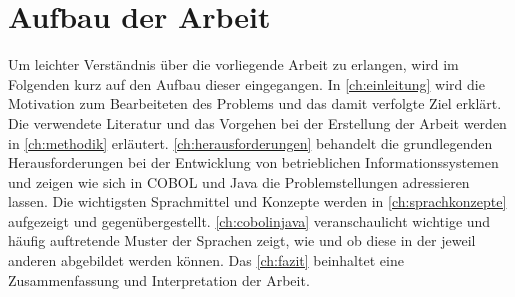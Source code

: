 \section{Aufbau der Arbeit}
Um leichter Verständnis über die vorliegende Arbeit zu erlangen, wird im Folgenden kurz auf den Aufbau dieser eingegangen.
In \autoref{ch:einleitung} wird die Motivation zum Bearbeiteten des Problems und das damit verfolgte Ziel erklärt. 
Die verwendete Literatur und das Vorgehen bei der Erstellung der Arbeit werden in \autoref{ch:methodik} erläutert.
\autoref{ch:herausforderungen} behandelt die grundlegenden Herausforderungen bei der Entwicklung von betrieblichen Informationssystemen und zeigen wie sich in COBOL und Java die Problemstellungen adressieren lassen.
Die wichtigsten Sprachmittel und Konzepte werden in \autoref{ch:sprachkonzepte} aufgezeigt und gegenübergestellt.
\autoref{ch:cobolinjava} veranschaulicht wichtige und häufig auftretende Muster der Sprachen zeigt, wie und ob diese in der jeweil anderen abgebildet werden können.
Das \autoref{ch:fazit} beinhaltet eine Zusammenfassung und Interpretation der Arbeit.
